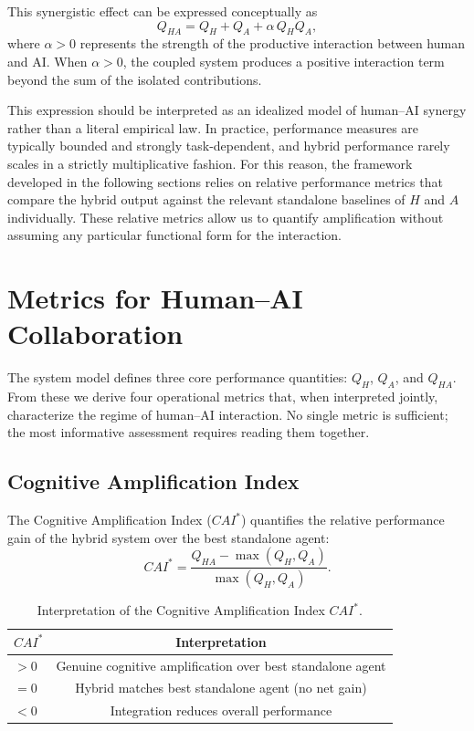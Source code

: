 \documentclass[11pt,a4paper]{article}
\begin{document}
This synergistic effect can be expressed conceptually as
\begin{equation}
Q_{HA} = Q_H + Q_A + \alpha \, Q_H Q_A,
\end{equation}
where $\alpha > 0$ represents the strength of the productive interaction between human and AI. When $\alpha > 0$, the coupled system produces a positive interaction term beyond the sum of the isolated contributions.

This expression should be interpreted as an idealized model of human--AI synergy rather than a literal empirical law. In practice, performance measures are typically bounded and strongly task-dependent, and hybrid performance rarely scales in a strictly multiplicative fashion. For this reason, the framework developed in the following sections relies on relative performance metrics that compare the hybrid output against the relevant standalone baselines of $H$ and $A$ individually. These relative metrics allow us to quantify amplification without assuming any particular functional form for the interaction.

\section{Metrics for Human--AI Collaboration}

The system model defines three core performance quantities: $Q_H$, $Q_A$, and $Q_{HA}$. From these we derive four operational metrics that, when interpreted jointly, characterize the regime of human--AI interaction. No single metric is sufficient; the most informative assessment requires reading them together.

\subsection{Cognitive Amplification Index}

The Cognitive Amplification Index ($CAI^*$) quantifies the relative performance gain of the hybrid system over the best standalone agent:
\begin{equation}
CAI^* = \frac{Q_{HA} - \max(Q_H, Q_A)}{\max(Q_H, Q_A)}.
\end{equation}

\begin{table}[htbp]
\centering
\begin{tabular}{lc}
\toprule
$CAI^*$ & Interpretation \\
\midrule
$> 0$   & Genuine cognitive amplification over best standalone agent \\
$= 0$   & Hybrid matches best standalone agent (no net gain) \\
$< 0$   & Integration reduces overall performance \\
\bottomrule
\end{tabular}
\caption{Interpretation of the Cognitive Amplification Index $CAI^*$.}
\label{tab:cai}
\end{table}
\end{document}

